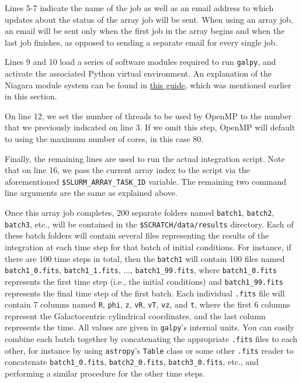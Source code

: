 \documentclass[10pt]{article}
\begin{document}
Lines 5-7 indicate the name of the job as well as an email address to which updates about the status of the array job will be sent. When using an array job, an email will be sent only when the first job in the array begins and when the last job finishes, as opposed to sending a separate email for every single job.

Lines 9 and 10 load a series of software modules required to run \texttt{galpy}, and activate the associated Python virtual environment. An explanation of the Niagara module system can be found in \href{https://github.com/mwbub/scinet-setup}{this guide}, which was mentioned earlier in this section.

On line 12, we set the number of threads to be used by OpenMP to the number that we previously indicated on line 3. If we omit this step, OpenMP will default to using the maximum number of cores, in this case 80.

Finally, the remaining lines are used to run the actual integration script. Note that on line 16, we pass the current array index to the script via the aforementioned \texttt{\$SLURM\_ARRAY\_TASK\_ID} variable. The remaining two command line arguments are the same as explained above.

Once this array job completes, 200 separate folders named \texttt{batch1}, \texttt{batch2}, \texttt{batch3}, etc., will be contained in the \texttt{\$SCRATCH/data/results} directory. Each of these batch folders will contain several files representing the results of the integration at each time step for that batch of initial conditions. For instance, if there are 100 time steps in total, then the \texttt{batch1} will contain 100 files named \texttt{batch1\_0.fits}, \texttt{batch1\_1.fits}, $\ldots$, \texttt{batch1\_99.fits}, where \texttt{batch1\_0.fits} represents the first time step (i.e., the initial conditions) and \texttt{batch1\_99.fits} represents the final time step of the first batch. Each individual \texttt{.fits} file will contain 7 columns named \texttt{R}, \texttt{phi}, \texttt{z}, \texttt{vR}, \texttt{vT}, \texttt{vz}, and \texttt{t}, where the first 6 columns represent the Galactocentric cylindrical coordinates, and the last column represents the time. All values are given in \texttt{galpy}'s internal units. You can easily combine each batch together by concatenating the appropriate \texttt{.fits} files to each other, for instance by using \texttt{astropy}'s \texttt{Table} class or some other \texttt{.fits} reader to concatenate \texttt{batch1\_0.fits}, \texttt{batch2\_0.fits}, \texttt{batch3\_0.fits}, etc., and performing a similar procedure for the other time steps.
\end{document}
